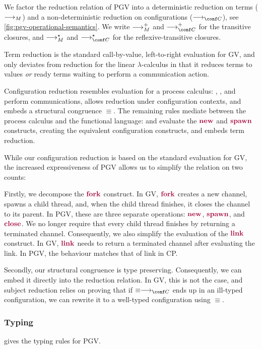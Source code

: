 \documentclass[main.tex]{subfiles}
\begin{document}
We factor the reduction relation of PGV into a deterministic reduction on terms ($\longrightarrow_{M}$) and a non-deterministic reduction on configurations ($\cred$), see \cref{fig:pgv-operational-semantics}. We write $\longrightarrow_{M}^+$ and $\cred^+$ for the transitive closures, and $\longrightarrow_{M}^\star$ and $\cred^\star$ for the reflexive-transitive closures.

Term reduction is the standard call-by-value, left-to-right evaluation for GV, and only deviates from reduction for the linear $\lambda$-calculus in that it reduces terms to values \emph{or} ready terms waiting to perform a communication action.

Configuration reduction resembles evaluation for a process calculus: , , and  perform communications,  allows reduction under configuration contexts, and  embeds a structural congruence $\equiv$. The remaining rules mediate between the process calculus and the functional language:  and  evaluate the $\tm{\new}$ and $\tm{\spawn}$ constructs, creating the equivalent configuration constructs, and  embeds term reduction.

While our configuration reduction is based on the standard evaluation for GV, the increased expressiveness of PGV allows us to simplify the relation on two counts:

Firstly, we decompose the $\tm{\fork}$ construct. In GV, $\tm{\fork}$ creates a new channel, spawns a child thread, and, when the child thread finishes, it closes the channel to its parent. In PGV, these are three separate operations: $\tm{\new}$, $\tm{\spawn}$, and $\tm{\close}$. We no longer require that every child thread finishes by returning a terminated channel. Consequently, we also simplify the evaluation of the $\tm{\link}$ construct. In GV, $\tm{\link}$ needs to return a terminated channel after evaluating the link. In PGV, the behaviour matches that of link in CP.

Secondly, our structural congruence is type preserving. Consequently, we can embed it directly into the reduction relation. In GV, this is not the case, and subject reduction relies on proving that if $\equiv\cred$ ends up in an ill-typed configuration, we can rewrite it to a well-typed configuration using $\equiv$.




\subsubsection*{Typing}
 gives the typing rules for PGV.
\end{document}
